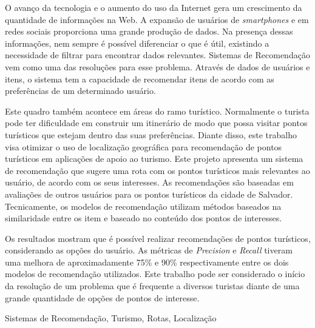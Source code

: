 O avanço da tecnologia e o aumento do uso da Internet gera um crescimento da quantidade de informações na Web. A expansão de usuários de \textit{smartphones} e em redes sociais proporciona uma grande produção de dados. Na presença dessas informações, nem sempre é possível diferenciar o que é útil, existindo a necessidade de filtrar para encontrar dados relevantes. Sistemas de Recomendação vem como uma das resoluções para esse problema. Através de dados de usuários e itens, o sistema tem a capacidade de recomendar itens de acordo com as preferências de um determinado usuário.

Este quadro também acontece em áreas do ramo turístico. Normalmente o turista pode ter dificuldade em construir um itinerário de modo que possa visitar pontos turísticos que estejam dentro das suas preferências. Diante disso, este trabalho visa otimizar o uso de localização geográfica para recomendação de pontos turísticos em aplicações de apoio ao turismo. Este projeto apresenta um sistema de recomendação que sugere uma rota com os pontos turísticos mais relevantes ao usuário, de acordo com os seus interesses. As recomendações são baseadas em avaliações de outros usuários para os pontos turísticos da cidade de Salvador. Tecnicamente, os modelos de recomendação utilizam métodos baseados na similaridade entre os item e baseado no conteúdo dos pontos de interesses.

Os resultados mostram que é possível realizar recomendações de pontos turísticos, considerando as opções do usuário. As métricas de \textit{Precision} e \textit{Recall} tiveram uma melhora de aproximadamente 75\% e 90\% respectivamente entre os dois modelos de recomendação utilizados. Este trabalho pode ser considerado o início da resolução de um problema que é frequente a diversos turistas diante de uma grande quantidade de opções de pontos de interesse.

\begin{keywords}
Sistemas de Recomendação, Turismo, Rotas, Localização
\end{keywords}
